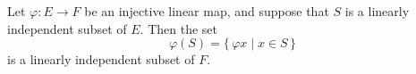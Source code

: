 Let $\varphi: E \rightarrow F$ be an injective linear map, and suppose that $S$ is a linearly independent subset of $E$. Then the set
$$
\varphi(S) = \{\, \varphi x \mid x \in S \,\}
$$
is a linearly independent subset of $F$.
